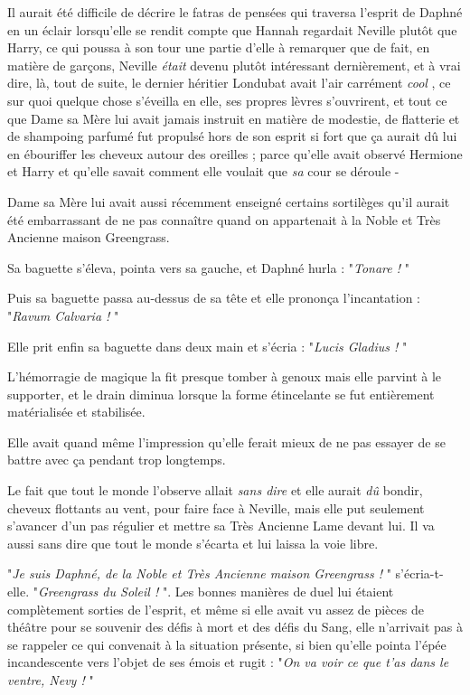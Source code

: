 Il aurait été difficile de décrire le fatras de pensées qui traversa l'esprit de Daphné en un éclair lorsqu'elle se rendit compte que Hannah regardait Neville plutôt que Harry, ce qui poussa à son tour une partie d'elle à remarquer que de fait, en matière de garçons, Neville \emph{était}  devenu plutôt intéressant dernièrement, et à vrai dire, là, tout de suite, le dernier héritier Londubat avait l'air carrément \emph{cool} , ce sur quoi quelque chose s'éveilla en elle, ses propres lèvres s'ouvrirent, et tout ce que Dame sa Mère lui avait jamais instruit en matière de modestie, de flatterie et de shampoing parfumé fut propulsé hors de son esprit si fort que ça aurait dû lui en ébouriffer les cheveux autour des oreilles ; parce qu'elle avait observé Hermione et Harry et qu'elle savait comment elle voulait que \emph{sa}  cour se déroule -

Dame sa Mère lui avait aussi récemment enseigné certains sortilèges qu'il aurait été embarrassant de ne pas connaître quand on appartenait à la Noble et Très Ancienne maison Greengrass.

Sa baguette s'éleva, pointa vers sa gauche, et Daphné hurla : "\emph{Tonare !} "

Puis sa baguette passa au-dessus de sa tête et elle prononça l'incantation : "\emph{Ravum Calvaria !} "

Elle prit enfin sa baguette dans deux main et s'écria : "\emph{Lucis Gladius !} "

L'hémorragie de magique la fit presque tomber à genoux mais elle parvint à le supporter, et le drain diminua lorsque la forme étincelante se fut entièrement matérialisée et stabilisée.

Elle avait quand même l'impression qu'elle ferait mieux de ne pas essayer de se battre avec ça pendant trop longtemps.

Le fait que tout le monde l'observe allait \emph{sans dire}  et elle aurait \emph{dû}  bondir, cheveux flottants au vent, pour faire face à Neville, mais elle put seulement s'avancer d'un pas régulier et mettre sa Très Ancienne Lame devant lui. Il va aussi sans dire que tout le monde s'écarta et lui laissa la voie libre.

"\emph{Je suis Daphné, de la Noble et Très Ancienne maison Greengrass !} " s'écria-t-elle. "\emph{Greengrass du Soleil !} ". Les bonnes manières de duel lui étaient complètement sorties de l'esprit, et même si elle avait vu assez de pièces de théâtre pour se souvenir des défis à mort et des défis du Sang, elle n'arrivait pas à se rappeler ce qui convenait à la situation présente, si bien qu'elle pointa l'épée incandescente vers l'objet de ses émois et rugit : "\emph{On va voir ce que t'as dans le ventre, Nevy !} "

